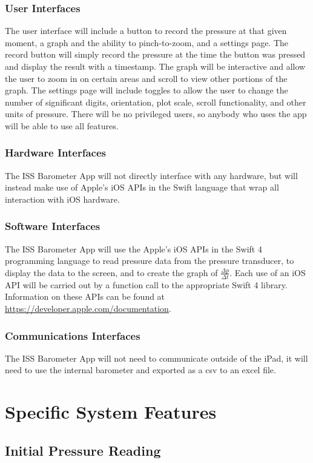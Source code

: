 \documentclass[onecolumn, draftclsnofoot,10pt, compsoc]{IEEEtran}
\def \CapstoneProjectName{ISS Barometer App }
\begin{document}
\subsubsection{User Interfaces}
The user interface will include a button to record the pressure at that given moment, a graph and the ability to pinch-to-zoom, and a settings page.
The record button will simply record the pressure at the time the button was pressed and display the result with a timestamp.
The graph will be interactive and allow the user to zoom in on certain areas and scroll to view other portions of the graph.
The settings page will include toggles to allow the user to change the number of significant digits, orientation, plot scale, scroll functionality, and other units of pressure.
There will be no privileged users, so anybody who uses the app will be able to use all features.

\subsubsection{Hardware Interfaces}
The \CapstoneProjectName will not directly interface with any hardware, but will instead make use of Apple's iOS APIs in the Swift language that wrap all interaction with iOS hardware.

\subsubsection{Software Interfaces}
The \CapstoneProjectName will use the Apple's iOS APIs in the Swift 4 programming language to read pressure data from the pressure transducer, to display the data to the screen, and to create the graph of $\frac{\Delta p}{\Delta t}$.
Each use of an iOS API will be carried out by a function call to the appropriate Swift 4 library. Information on these APIs can be found at \url{https://developer.apple.com/documentation}.

\subsubsection{Communications Interfaces}
The ISS Barometer App will not need to communicate outside of the iPad, it will need to use the internal barometer and exported as a csv to an excel file.
\section{Specific System Features}

\subsection{Initial Pressure Reading}
\end{document}
